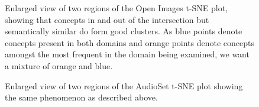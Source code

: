 \begin{figure}[H]

    \centering
    \caption{\label{fig:openimageszoom}Enlarged view of two regions of the Open Images t-SNE plot, showing that concepts in and out of the intersection but semantically similar do form good clusters. As blue points denote concepts present in both domains and orange points denote concepts amongst the most frequent in the domain being examined, we want a mixture of orange and blue. }
\end{figure}

\begin{figure}[H]

    \centering
    \caption{\label{fig:audiosetzoom}Enlarged view of two regions of the AudioSet t-SNE plot showing the same phenomenon as described above.}
\end{figure}

